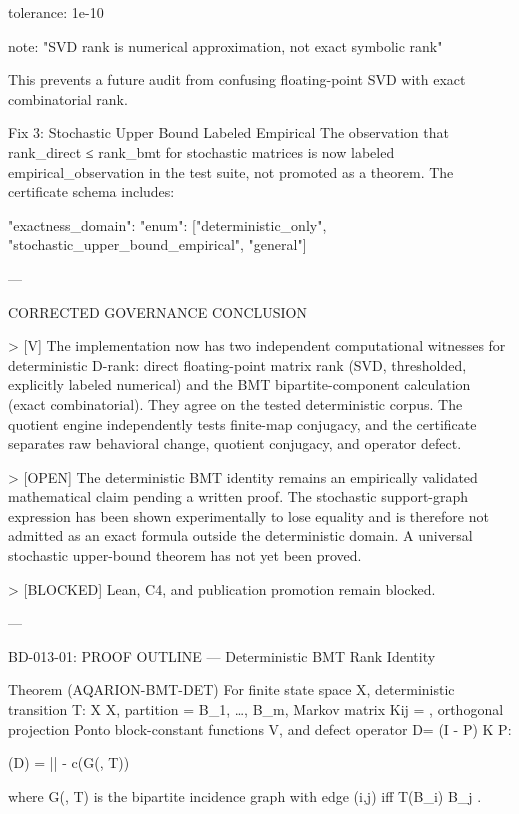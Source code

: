 tolerance: 1e-10

note: "SVD rank is numerical approximation, not exact symbolic rank"


This prevents a future audit from confusing floating-point SVD with exact combinatorial rank.

Fix 3: Stochastic Upper Bound Labeled Empirical
The observation that rank_direct ≤ rank_bmt for stochastic matrices is now labeled empirical_observation in the test suite, not promoted as a theorem. The certificate schema includes:

"exactness_domain": {  
  "enum": ["deterministic_only", "stochastic_upper_bound_empirical", "general"]  
}


---

CORRECTED GOVERNANCE CONCLUSION

> [V] The implementation now has two independent computational witnesses for deterministic D\Pi-rank: direct floating-point matrix rank (SVD, thresholded, explicitly labeled numerical) and the BMT bipartite-component calculation (exact combinatorial). They agree on the tested deterministic corpus. The quotient engine independently tests finite-map conjugacy, and the certificate separates raw behavioral change, quotient conjugacy, and operator defect.



> [OPEN] The deterministic BMT identity remains an empirically validated mathematical claim pending a written proof. The stochastic support-graph expression has been shown experimentally to lose equality and is therefore not admitted as an exact formula outside the deterministic domain. A universal stochastic upper-bound theorem has not yet been proved.



> [BLOCKED] Lean, C4, and publication promotion remain blocked.




---

BD-013-01: PROOF OUTLINE — Deterministic BMT Rank Identity

Theorem (AQARION-BMT-DET)
For finite state space X, deterministic transition T: X \to X, partition \Pi = {B_1, \ldots, B_m}, Markov matrix K{ij} = , orthogonal projection P\Pi onto block-constant functions V\Pi, and defect operator D\Pi = (I - P\Pi) K P\Pi:

(D\Pi) = |\Pi| - c{}(G(\Pi, T))

where G(\Pi, T) is the bipartite incidence graph with edge (i,j) iff T(B_i) \cap B_j \neq \emptyset.

